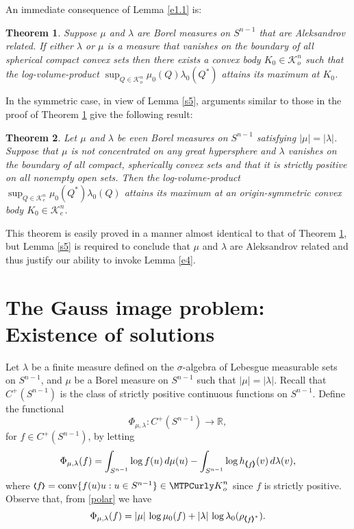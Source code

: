 \documentclass{cpamart1}     %
\newtheorem{theo}{Theorem}[section]
\theoremstyle{definition}
\theoremstyle{remark}
\newcommand{\ro}{\mathbb R}
\newcommand{\sn}{S^{n-1}}
\newcommand{\kno}{\mathcal K^n_o}
\newcommand{\kne}{\mathcal K^n_e}
\newcommand{\conv}{\operatorname{conv}}
\newcommand{\bla}{\raise.2ex\hbox{$\scriptstyle\pmb \langle$}}
\newcommand{\bra}{\raise.2ex\hbox{$\scriptstyle\pmb \rangle$}}
\begin{document}
An immediate consequence of Lemma \ref{e1.1} is:


\begin{theo}\label{f2}
Suppose $\mu$ and $\lambda$ are Borel measures on $\sn$
that are Aleksandrov related. If either $\lambda$ or $\mu$ is a measure that vanishes on the boundary
of all spherical compact convex sets
then there exists a convex body $K_0\in \mathcal{K}_o^n$ such that the log-volume-product $\sup_{Q\in\kno}\mu_0(Q)\lambda_0(Q^*)$
attains its maximum at $K_0$.
\end{theo}




In the symmetric case, in view of Lemma \ref{s5}, arguments similar to those in the proof of Theorem \ref{f2} give the following result:

\begin{theo}\label{f2.1}
Let $\mu$ and $\lambda$ be even Borel measures on $\sn$
satisfying $|\mu|=|\lambda|$. Suppose that $\mu$
is not concentrated on any great hypersphere and
$\lambda$ vanishes on the boundary
of all compact, spherically convex sets and that it is strictly positive on all nonempty open sets.
Then the
log-volume-product $\sup_{Q\in\kne}\mu_0(Q^*)\lambda_0(Q)$
attains its maximum at an origin-symmetric convex body $K_0\in \mathcal K_e^n$.
\end{theo}

This theorem is easily proved in a manner almost identical to that of Theorem \ref{f2}, but
Lemma \ref{s5} is required to conclude that $\mu$ and $\lambda$ are Aleksandrov related and thus
justify our ability to invoke Lemma \ref{e4}.










\section{The Gauss image problem: Existence of solutions}


Let $\lambda$ be a finite measure defined on the $\sigma$-algebra of Lebesgue measurable
sets on $\sn$, and $\mu$ be a Borel measure on $\sn$ such that $|\mu|=|\lambda|$. Recall that $C^+(\sn)$ is the class of strictly positive continuous
functions on $\sn$. Define the functional
\[
\Phi_{\mu,\lambda}:C^+(\sn) \to \ro,
\]
for $f\in C^+(\sn)$, by letting
\begin{equation}\label{phi}
\Phi_{\mu,\lambda}(f)= \int_{\sn} \log f(u) \, d\mu(u) -
\int_{\sn} \log h_{\bla f \bra }(v) \, d\lambda(v),
\end{equation}
where $\bla f \bra = \conv \{f(u)u : u\in\sn \}\in\kno$ since $f$
is strictly positive. Observe that, from \eqref{polar} we have
\begin{equation*}
\Phi_{\mu,\lambda}(f) = |\mu|\,\log \mu_0(f) + |\lambda|\,\log \lambda_0(\rho_{\bla f \bra^*}).
\end{equation*}
\end{document}
